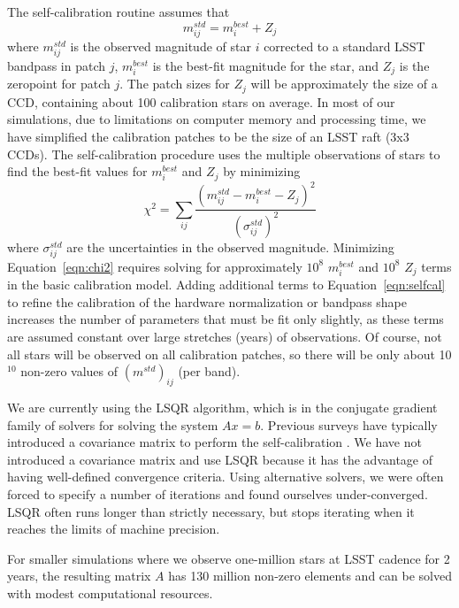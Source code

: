 \documentclass[12pt,preprint]{aastex}
\begin{document}
The self-calibration routine assumes that
\begin{equation} \label{eqn:selfcal}
m_{ij}^{std} = m_i^{best}+Z_j
\end{equation}
where $m_{ij}^{std}$ is the observed magnitude of star $i$ corrected
to a standard LSST bandpass in patch $j$, $m_i^{best}$ is the best-fit
magnitude for the star, and $Z_j$ is the zeropoint for patch $j$. The
patch sizes for $Z_j$ will be approximately the size of a CCD,
containing about 100 calibration stars on average. In most of our
simulations, due to limitations on computer memory and processing
time, we have simplified the calibration patches to be the size of an
LSST raft (3x3 CCDs). The self-calibration procedure uses the multiple
observations of stars to find the best-fit values for $m_i^{best}$ and
$Z_j$ by minimizing
\begin{equation} \label{eqn:chi2}
\chi^2 = \sum_{ij} \frac{(m^{std}_{ij}-m_{i}^{best}-Z_j)^2}{(\sigma_{ij}^{std})^2}
\end{equation}  
where $\sigma_{ij}^{std}$ are the uncertainties in the observed
magnitude.  Minimizing Equation~\ref{eqn:chi2} requires solving for
approximately $10^8$ $m_{i}^{best}$ and $10^8$ $Z_j$ terms in the
basic calibration model. Adding additional terms to
Equation~\ref{eqn:selfcal} to refine the calibration of the hardware
normalization or bandpass shape increases the number of parameters
that must be fit only slightly, as these terms are assumed constant
over large stretches (years) of observations. Of course, not all stars
will be observed on all calibration patches, so there will be only
about 10$^{10}$ non-zero values of $(m^{std})_{ij}$ (per band).

We are currently using the LSQR algorithm, which is in the conjugate gradient
family of solvers for solving the system $Ax=b$.  Previous surveys
have typically introduced a covariance matrix to perform the
self-calibration \citep{pad08,Schaf12}.  We have not introduced a
covariance matrix and use LSQR because it has the advantage of having
well-defined convergence criteria.  Using alternative solvers, we were
often forced to specify a number of iterations and found ourselves
under-converged.  LSQR often runs longer than strictly necessary, but
stops iterating when it reaches the limits of machine precision.

For smaller simulations where we observe one-million stars at LSST
cadence for 2 years, the resulting matrix $A$ has 130 million non-zero
elements and can be solved with modest computational resources.
\end{document}
